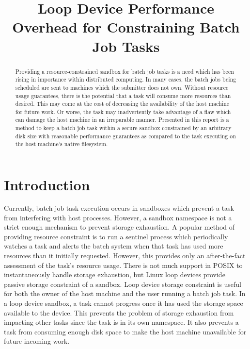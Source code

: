 \documentclass[conference]{IEEEtran}
\begin{document}
%
\title{Loop Device Performance Overhead for Constraining Batch Job Tasks}


\author{
}


\maketitle


\begin{abstract}
Providing a resource-constrained sandbox for batch job tasks is a need which has been rising in importance within distributed computing. In many cases, the batch jobs being scheduled are sent to machines which the submitter does not own. Without resource usage guarantees, there is the potential that a task will consume more resources than desired. This may come at the cost of decreasing the availability of the host machine for future work. Or worse, the task may inadvertently take advantage of a flaw which can damage the host machine in an irreparable manner. Presented in this report is a method to keep a batch job task within a secure sandbox constrained by an arbitrary disk size with reasonable performance guarantees as compared to the task executing on the host machine's native filesystem.
\end{abstract}

\IEEEpeerreviewmaketitle



\section{Introduction}
Currently, batch job task execution occurs in sandboxes which prevent a task from interfering with host processes. However, a sandbox namespace is not a strict enough mechanism to prevent storage exhaustion. A popular method of providing resource constraint is to run a sentinel process which periodically watches a task and alerts the batch system when that task has used more resources than it initially requested. However, this provides only an after-the-fact assessment of the task's resource usage. There is not much support in POSIX to instantaneously handle storage exhaustion, but Linux loop devices provide passive storage constraint of a sandbox. Loop device storage constraint is useful for both the owner of the host machine and the user running a batch job task. In a loop device sandbox, a task cannot progress once it has used the storage space available to the device. This prevents the problem of storage exhaustion from impacting other tasks since the task is in its own namespace. It also prevents a task from consuming enough disk space to make the host machine unavailable for future incoming work.
\end{document}
